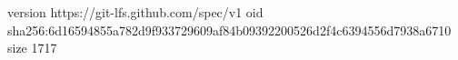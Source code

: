 version https://git-lfs.github.com/spec/v1
oid sha256:6d16594855a782d9f933729609af84b09392200526d2f4c6394556d7938a6710
size 1717
